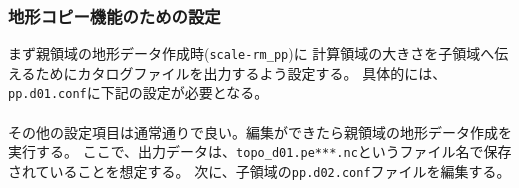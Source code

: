 \subsubsection{地形コピー機能のための設定}

まず親領域の地形データ作成時(\verb|scale-rm_pp|)に
計算領域の大きさを子領域へ伝えるためにカタログファイルを出力するよう設定する。
具体的には、\verb|pp.d01.conf|に下記の設定が必要となる。\\

\\

\noindent その他の設定項目は通常通りで良い。編集ができたら親領域の地形データ作成を実行する。
ここで、出力データは、\verb|topo_d01.pe***.nc|というファイル名で保存されていることを想定する。
次に、子領域の\verb|pp.d02.conf|ファイルを編集する。\\

